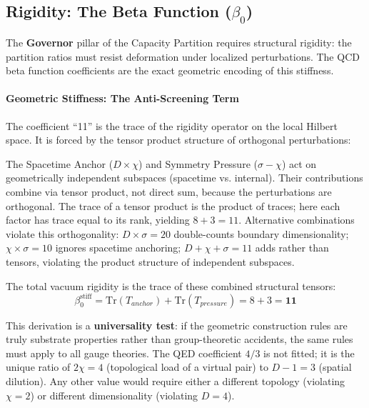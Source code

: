 

\subsection{Rigidity: The Beta Function (\texorpdfstring{$\beta_0$}{beta\_0})}

The \textbf{Governor} pillar of the Capacity Partition requires structural rigidity: the partition ratios must resist deformation under localized perturbations. The QCD beta function coefficients are the exact geometric encoding of this stiffness.

\paragraph{Geometric Stiffness: The Anti-Screening Term}
The coefficient ``11'' is the trace of the rigidity operator on the local Hilbert space. It is forced by the tensor product structure of orthogonal perturbations:

The Spacetime Anchor ($D \times \chi$) and Symmetry Pressure ($\sigma - \chi$) act on geometrically independent subspaces (spacetime vs. internal). Their contributions combine via tensor product, not direct sum, because the perturbations are orthogonal. The trace of a tensor product is the product of traces; here each factor has trace equal to its rank, yielding $8 + 3 = 11$. Alternative combinations violate this orthogonality: $D \times \sigma = 20$ double-counts boundary dimensionality; $\chi \times \sigma = 10$ ignores spacetime anchoring; $D + \chi + \sigma = 11$ adds rather than tensors, violating the product structure of independent subspaces.

The total vacuum rigidity is the trace of these combined structural tensors:
\begin{equation}
    \beta_0^{\text{stiff}} = \text{Tr}(T_{anchor}) + \text{Tr}(T_{pressure}) = 8 + 3 = \mathbf{11}
\end{equation}

This derivation is a \textbf{universality test}: if the geometric construction rules are truly substrate properties rather than group-theoretic accidents, the same rules must apply to all gauge theories. The QED coefficient $4/3$ is not fitted; it is the unique ratio of $2\chi = 4$ (topological load of a virtual pair) to $D-1 = 3$ (spatial dilution). Any other value would require either a different topology (violating $\chi=2$) or different dimensionality (violating $D=4$).

